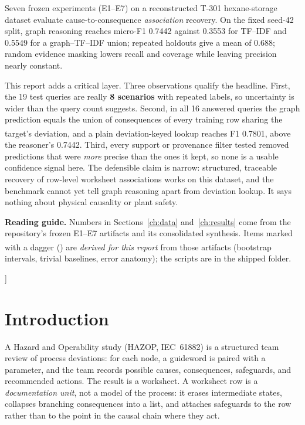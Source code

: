 \documentclass[10pt,twocolumn,a4paper]{extarticle}
\newcommand{\derived}{\textsuperscript{\textdagger}}
\begin{document}
{\begin{tcolorbox}[enhanced,colback=paper,colframe=teal!60,arc=2pt,boxrule=0.5pt,left=8pt,right=8pt,top=4pt,bottom=4pt,
  title={Abstract},fonttitle=\bfseries\small,coltitle=white,colbacktitle=teal]
Seven frozen experiments (E1--E7) on a reconstructed T-301 hexane-storage dataset evaluate cause-to-consequence \emph{association} recovery. On the fixed seed-42 split, graph reasoning reaches micro-F1 0.7442 against 0.3553 for TF--IDF and 0.5549 for a graph--TF--IDF union; repeated holdouts give a mean of 0.688; random evidence masking lowers recall and coverage while leaving precision nearly constant.

This report adds a critical layer. Three observations qualify the headline. First, the 19 test queries are really \textbf{8 scenarios} with repeated labels, so uncertainty is wider than the query count suggests. Second, in all 16 answered queries the graph prediction equals the union of consequences of every training row sharing the target's deviation, and a plain deviation-keyed lookup\derived{} reaches F1 0.7801, above the reasoner's 0.7442. Third, every support or provenance filter tested removed predictions that were \emph{more} precise than the ones it kept, so none is a usable confidence signal here. The defensible claim is narrow: structured, traceable recovery of row-level worksheet associations works on this dataset, and the benchmark cannot yet tell graph reasoning apart from deviation lookup. It says nothing about physical causality or plant safety.

\smallskip
{\footnotesize\textbf{Reading guide.} Numbers in Sections~\ref{ch:data} and~\ref{ch:results} come from the repository's frozen E1--E7 artifacts and its consolidated synthesis. Items marked with a dagger ({\derived}) are \emph{derived for this report} from those artifacts (bootstrap intervals, trivial baselines, error anatomy); the scripts are in the shipped  folder.}
\end{tcolorbox}
\vspace{4pt}
}]

\section{Introduction}\label{ch:intro}

A Hazard and Operability study (HAZOP, IEC~61882) is a structured team review of process deviations: for each node, a guideword is paired with a parameter, and the team records possible causes, consequences, safeguards, and recommended actions. The result is a worksheet. A worksheet row is a \emph{documentation unit}, not a model of the process: it erases intermediate states, collapses branching consequences into a list, and attaches safeguards to the row rather than to the point in the causal chain where they act.
\end{document}
